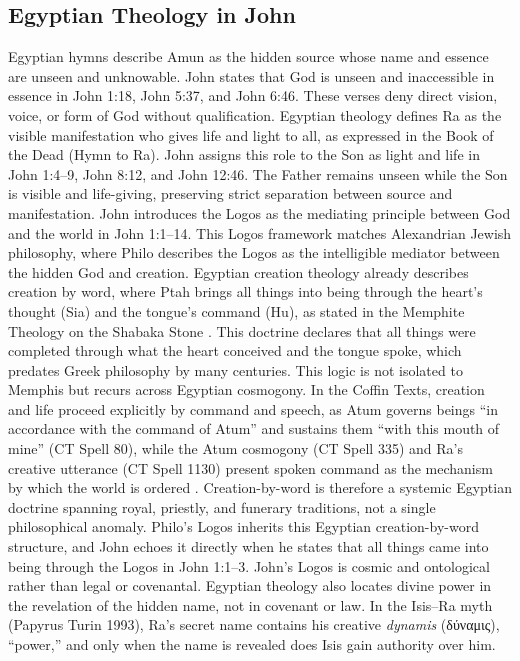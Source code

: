 \subsection{Egyptian Theology in John}

Egyptian hymns describe Amun as the hidden source whose name and essence are unseen and unknowable.
John states that God is unseen and inaccessible in essence in John 1:18, John 5:37, and John 6:46.
These verses deny direct vision, voice, or form of God without qualification.
Egyptian theology defines Ra as the visible manifestation who gives life and light to all, as expressed in the Book of the Dead \cite[Chapter 15]{bookofthedead} (Hymn to Ra).
John assigns this role to the Son as light and life in John 1:4--9, John 8:12, and John 12:46.
The Father remains unseen while the Son is visible and life-giving, preserving strict separation between source and manifestation.
John introduces the Logos as the mediating principle between God and the world in John 1:1--14.
This Logos framework matches Alexandrian Jewish philosophy, where Philo describes the Logos as the intelligible mediator between the hidden God and creation.
Egyptian creation theology already describes creation by word, where Ptah brings all things into being through the heart's thought (Sia) and the tongue's command (Hu), as stated in the Memphite Theology on the Shabaka Stone \cite{shabaka:memphite}.
This doctrine declares that all things were completed through what the heart conceived and the tongue spoke, which predates Greek philosophy by many centuries.
This logic is not isolated to Memphis but recurs across Egyptian cosmogony.
In the Coffin Texts, creation and life proceed explicitly by command and speech, as Atum governs beings ``in accordance with the command of Atum'' and sustains them ``with this mouth of mine'' (CT Spell 80), while the Atum cosmogony (CT Spell 335) and Ra's creative utterance (CT Spell 1130) present spoken command as the mechanism by which the world is ordered \cite[Spell 80]{coffintexts}.
Creation-by-word is therefore a systemic Egyptian doctrine spanning royal, priestly, and funerary traditions, not a single philosophical anomaly.
Philo's Logos inherits this Egyptian creation-by-word structure, and John echoes it directly when he states that all things came into being through the Logos in John 1:1--3.
John's Logos is cosmic and ontological rather than legal or covenantal.
Egyptian theology also locates divine power in the revelation of the hidden name, not in covenant or law.
In the Isis--Ra myth (Papyrus Turin 1993), Ra's secret name contains his creative \emph{dynamis} (δύναμις), ``power,'' and only when the name is revealed does Isis gain authority over him.
